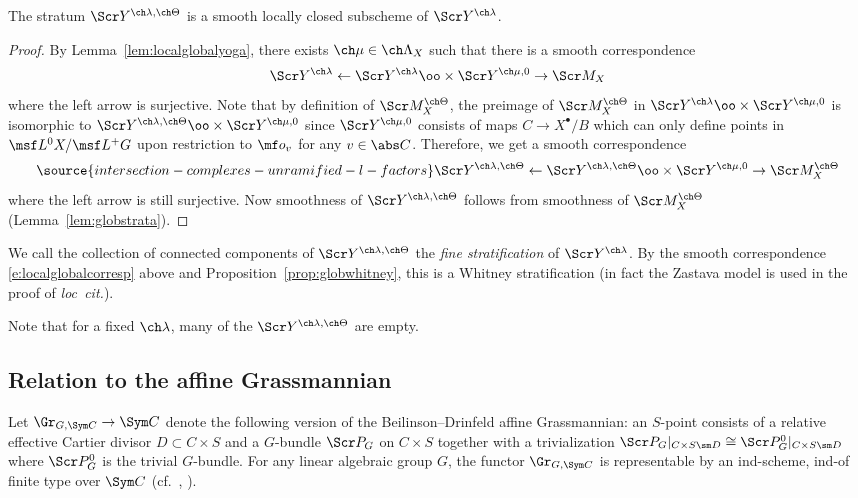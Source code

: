 \begin{prop}
\notready \label{prop:localstrata}
The stratum $\Scr Y^{\ch\lambda,\ch\Theta}$ is a smooth locally closed
subscheme of $\Scr Y^{\ch\lambda}$.
\end{prop}
\begin{proof}
By Lemma~\ref{lem:localglobalyoga}, there exists $\ch\mu\in\ch\Lambda_X$
such that there is a smooth correspondence
\[ \Scr Y^{\ch\lambda} \leftarrow \Scr Y^{\ch\lambda}\oo\times \Scr Y^{\ch\mu,0} \to \Scr M_X \]
where the left arrow is surjective.
Note that by definition of $\Scr M_X^{\ch\Theta}$, the preimage of
$\Scr M_X^{\ch\Theta}$ in $\Scr Y^{\ch\lambda}\oo\times\Scr Y^{\ch\mu,0}$
is isomorphic to $\Scr Y^{\ch\lambda,\ch\Theta} \oo\times \Scr Y^{\ch\mu,0}$
since $\Scr Y^{\ch\mu,0}$ consists
of maps $C\to X^\bullet/B$ which can only define points in $\msf L^0 X/\msf L^+ G$
upon restriction to $\mf o_v$ for any $v\in \abs C$.
Therefore, we get a smooth correspondence
\begin{equation} \label{e:localglobalcorresp}
\source{intersection-complexes-unramified-l-factors}
    \Scr Y^{\ch\lambda,\ch\Theta} \leftarrow \Scr Y^{\ch\lambda,\ch\Theta} \oo\times \Scr Y^{\ch\mu,0} \to \Scr M_X^{\ch\Theta}
\end{equation}
where the left arrow is still surjective.
Now smoothness of $\Scr Y^{\ch\lambda,\ch\Theta}$ follows from smoothness
of $\Scr M_X^{\ch\Theta}$ (Lemma~\ref{lem:globstrata}).
\end{proof}

We call the collection of connected components of $\Scr Y^{\ch\lambda,\ch\Theta}$ the
\emph{fine stratification} of $\Scr Y^{\ch\lambda}$. By the smooth
correspondence \eqref{e:localglobalcorresp} above
and Proposition~\ref{prop:globwhitney}, this is a Whitney stratification (in fact
the Zastava model is used in the proof of \emph{loc~cit.}).

Note that for a fixed $\ch\lambda$, many of the
 $\Scr Y^{\ch\lambda,\ch\Theta}$ are empty.



\subsection{Relation to the affine Grassmannian} \label{sect:YGr}

Let $\Gr_{G,\Sym C} \to \Sym C$ denote the following version of the Beilinson--Drinfeld affine Grassmannian: an $S$-point consists of a relative effective Cartier divisor $D \subset C\times S$ and a $G$-bundle $\Scr P_G$ on $C\times S$ together with a trivialization
$\Scr P_G|_{C\times S \sm D} \cong \Scr P_G^0|_{C\times S\sm D}$ where
$\Scr P_G^0$ is the trivial $G$-bundle.
For any linear algebraic group $G$, the functor $\Gr_{G,\Sym C}$ is representable by an ind-scheme, ind-of finite type
over $\Sym C$ (cf.~\cite{BD}, \cite[Theorem 3.1.3]{Xinwen}).

